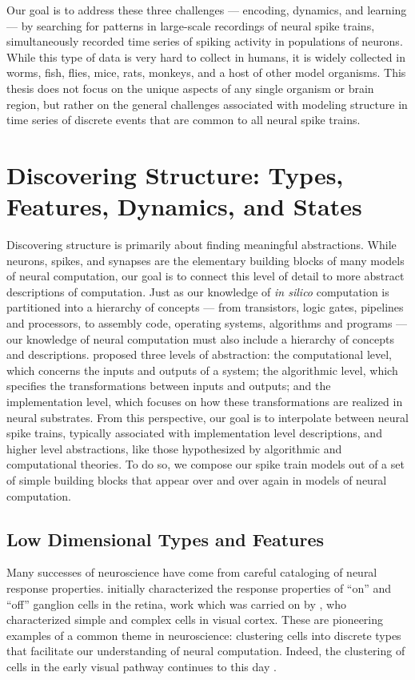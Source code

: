 Our goal is to address these three challenges --- encoding,
dynamics, and learning --- by searching for patterns in large-scale
recordings of neural spike trains, simultaneously recorded time series
of spiking activity in populations of neurons. While this type of data is
very hard to collect in humans, it is widely collected in worms, fish,
flies, mice, rats, monkeys, and a host of other model organisms.
This thesis does not focus on the unique aspects of any single organism
or brain region, but rather on the general challenges associated
with modeling structure in time series of discrete events that are
common to all neural spike trains. 


\section{Discovering Structure: Types, Features, Dynamics, and States}
Discovering structure is primarily about finding meaningful abstractions.  
While neurons, spikes, and
synapses are the elementary building blocks of many models of neural
computation, our goal is to connect this level of detail to more
abstract descriptions of computation.  Just as our knowledge of
\emph{in silico} computation is partitioned into a hierarchy of
concepts --- from transistors, logic gates, pipelines and processors,
to assembly code, operating systems, algorithms and programs --- our
knowledge of neural computation must also include a hierarchy of
concepts and descriptions.  \citet{marr1982vision} proposed three
levels of abstraction: the computational level, which concerns the inputs
and outputs of a system; the algorithmic level, which specifies the
transformations between inputs and outputs; and the implementation
level, which focuses on how these transformations are realized in
neural substrates.  From this perspective, our goal is to interpolate
between neural spike trains, typically associated with implementation
level descriptions, and higher level abstractions, like those
hypothesized by algorithmic and computational theories. To do so,
we compose our spike train models out of a set of simple
building blocks that appear over and over again in models of
neural computation. 

\subsection{Low Dimensional Types and Features}
Many successes of neuroscience have come from careful cataloging 
of neural response properties. \citet{kuffler1953discharge} initially characterized 
the response properties of ``on'' and ``off'' ganglion cells in the 
retina, work which was carried on by \citet{hubel1962receptive}, 
who characterized simple and complex cells in visual cortex. 
These are pioneering examples of a common theme in neuroscience: 
clustering cells into discrete types that facilitate our understanding 
of neural computation. Indeed, the clustering of cells in the 
early visual pathway continues to this day \cite{macosko2015highly, sanes2015types}. 

